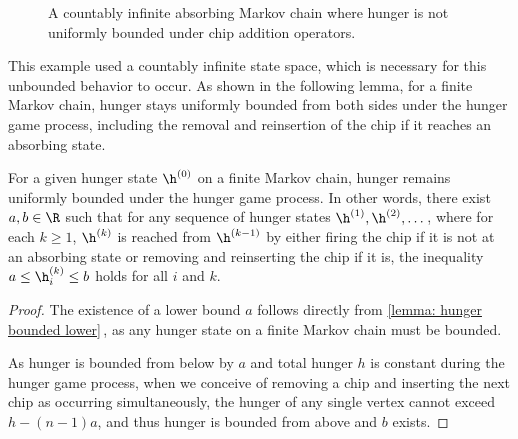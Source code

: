\begin{figure}[htbp!]
    \caption{A countably infinite absorbing Markov chain where hunger is not uniformly bounded under chip addition operators.}
    \label{fig:rem unbounded hunger harmonic}
\end{figure}

This example used a countably infinite state space, which is necessary for this unbounded behavior to occur.
As shown in the following lemma, for a finite Markov chain, 
hunger stays uniformly bounded from both sides under the hunger game process,
including the removal and reinsertion of the chip 
if it reaches an absorbing state.

\begin{lemma}\label{lemma: hunger bounded}
For a given hunger state $\h^{(0)}$ on a finite Markov chain, 
hunger remains uniformly bounded under the hunger game process.
In other words, there exist $a,b \in \R$ such that for any sequence
of hunger states $\h^{(1)},\h^{(2)},\dots$, where for each $k\geq 1$,
$\h^{(k)}$ is reached from $\h^{(k-1)}$ by either
firing the chip if it is not at an absorbing state
or removing and reinserting the chip if it is,
the inequality $a \leq \h^{(k)}_i \leq b$ holds for all $i$ and $k$.
\end{lemma}
\begin{proof}
The existence of a lower bound $a$ follows directly 
from \cref{lemma: hunger bounded lower}\,, 
as any hunger state on a finite Markov chain must be bounded.

As hunger is bounded from below by $a$ 
and total hunger $h$ is constant during the hunger game process, 
when we conceive of removing a chip and inserting the next chip 
as occurring simultaneously, 
the hunger of any single vertex cannot exceed $h-(n-1)a$, 
and thus hunger is bounded from above and $b$ exists.
\end{proof}

